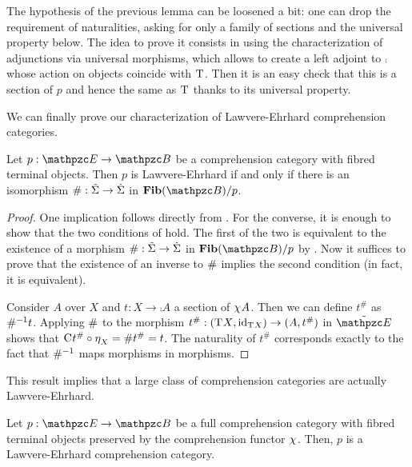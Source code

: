 \documentclass{lmcs} %
\theoremstyle{plain}\newtheorem{satz}[thm]{Satz} %
\begin{document}
			\begin{rem}
				The hypothesis of the previous lemma can be loosened a bit: one can drop the requirement of naturalities, asking for only a family of sections and the universal property below. The idea to prove it consists in using the characterization of adjunctions via universal morphisms, which allows to create a left adjoint to $\comp{}$ whose action on objects coincide with $\mathrm{T}^{}$. Then it is an easy check that this is a section of $p$ and hence the same as $\mathrm{T}^{}$ thanks to its universal property.
			\end{rem}

We can finally prove our characterization of Lawvere-Ehrhard comprehension categories. 

			\begin{thm}\label{thm:ess-im}
				Let $p:\ct{E}\to\ct{B}$ be a comprehension category with fibred terminal objects. 
Then $p$ is Lawvere-Ehrhard if and only if there is an isomorphism $\#{}:\tilde{\Sigma}\to\dot{\Sigma}$ in $\Fib(\ct{B})/p$.
			\end{thm}
			
			\begin{proof}
				One implication follows directly from . For the converse, it is enough to show that the two conditions of  hold. The first of the two is equivalent to the existence of a morphism $\#:\tilde{\Sigma}\to\dot{\Sigma}$ in $\Fib(\ct{B})/p$ by . Now it suffices to prove that the existence of an inverse to $\#$ implies the second condition (in fact, it is equivalent).
				
				Consider $A$ over $X$ and $t:X\to\comp{}A$ a section of $\chi^{}A$. Then we can define $t^\#$ as $\#^{-1}t$.
				Applying $\#$ to the morphism $t^\#:({\mathrm{T}^{}X},\mathrm{id}_{\mathrm{T}^{}X})\to(A,t^\#)$ in $\gtcat{\ct{E}}$ shows that $\mathrm{C}^{}t^\#\circ\mathrm{\eta}^{}_X=\# t^\#=t$. The naturality of $t^\#$ corresponds exactly to the fact that $\#^{-1}$ maps morphisms in morphisms.
				
			\end{proof}
			
			This result implies that a large class of comprehension categories are actually Lawvere-Ehrhard.
			
			\begin{cor}\label{cor:full}
Let $p:\ct{E}\to\ct{B}$ be a full comprehension category with fibred terminal objects preserved by the comprehension functor $\chi^{}$. 
Then, $p$ is a Lawvere-Ehrhard comprehension category. 
			\end{cor}
			
\end{document}
